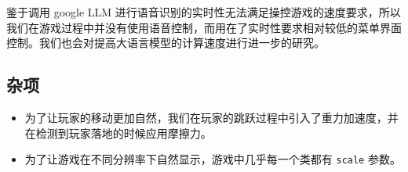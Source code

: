 \documentclass[12pt, twoside, a4paper]{article}
\newcommand{\inlinecode}[1]{\setlength{\fboxsep}{0.8mm} \colorbox{lightgray!40}{\texttt{#1}}}
\begin{document}
鉴于调用 google LLM 进行语音识别的实时性无法满足操控游戏的速度要求，所以我们在游戏过程中并没有使用语音控制，而用在了实时性要求相对较低的菜单界面控制。我们也会对提高大语言模型的计算速度进行进一步的研究。

\subsection{杂项}

\begin{itemize}
    \item 为了让玩家的移动更加自然，我们在玩家的跳跃过程中引入了重力加速度，并在检测到玩家落地的时候应用摩擦力。
    \item 为了让游戏在不同分辨率下自然显示，游戏中几乎每一个类都有 \inlinecode{scale} 参数。
\end{itemize}
\end{document}
